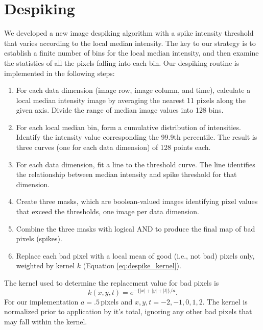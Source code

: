 \section{Despiking}\label{despike}
    We developed a new image despiking algorithm with a spike intensity threshold that varies according to the local median intensity. The key to our strategy is to establish a finite number of bins for the local median intensity, and then examine the statistics of all the pixels falling into each bin. Our despiking routine is implemented in the following steps:
\begin{enumerate}
    \item For each data dimension (image row, image column, and time), calculate a local median intensity image by averaging the nearest 11 pixels along the given axis. Divide the range of median image values into 128 bins.
    \item For each local median bin, form a cumulative distribution of intensities. Identify the intensity value corresponding the 99.9th percentile. The result is three curves (one for each data dimension) of 128 points each. 
    \item For each data dimension, fit a line to the threshold curve. The line identifies the relationship between median intensity and spike threshold for that dimension.
    \item Create three masks, which are  boolean-valued images identifying pixel values that exceed the thresholds, one image per data dimension.
    \item Combine the three masks with logical AND to produce the final map of bad pixels (spikes). 
    \item Replace each bad pixel with a local mean of good (i.e., not bad) pixels only, weighted by kernel $k$ (Equation \ref{eq:despike_kernel}).
\end{enumerate}
The kernel used to determine the replacement value for bad pixels is
\begin{equation} \label{eq:despike_kernel}
    k(x,y,t) = e^{-\lbrace|x|+|y|+|t|\rbrace/a}.
\end{equation}
For our implementation $a=.5$\,pixels and $x,y,t= -2, -1, 0, 1 , 2$.
The kernel is normalized prior to application by it's total, ignoring any other bad pixels that may fall within the kernel.

